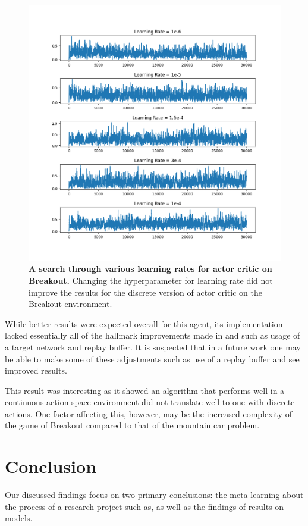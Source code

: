 \documentclass[conference]{IEEEtran}
\begin{document}
\begin{figure}[htbp]
\centerline{\includegraphics[scale=0.4]{actor_critic_breakout_lr_search.png}}
\caption{\textbf{A search through various learning rates for actor critic on Breakout.}  Changing the hyperparameter for learning rate did not improve the results for the discrete version of actor critic on the Breakout environment.}
\label{fig:actorCriticLearningRateSearch}
\end{figure}

While better results were expected overall for this agent, its implementation lacked essentially all of the hallmark improvements made in \cite{DQNOriginalPaper} and \cite{NatureDeepLearning} such as usage of a target network and replay buffer.
It is suspected that in a future work one may be able to make some of these adjustments such as use of a replay buffer and see improved results.

This result was interesting as it showed an algorithm that performs well in a continuous action space environment did not translate well to one with discrete actions.
One factor affecting this, however, may be the increased complexity of the game of Breakout compared to that of the mountain car problem.

\section{Conclusion} \label{conclusion}
Our discussed findings focus on two primary conclusions: the meta-learning about the process of a research project such as, as well as the findings of results on models.
\end{document}

